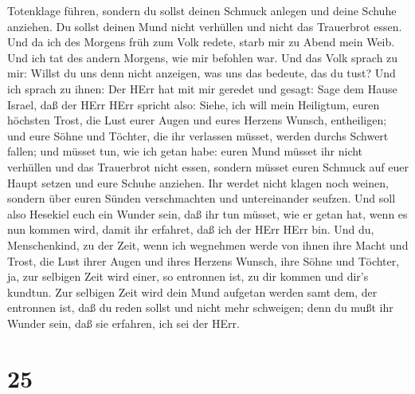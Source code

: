 Totenklage führen, sondern du sollst deinen Schmuck anlegen und deine
Schuhe anziehen. Du sollst deinen Mund nicht verhüllen und nicht das
Trauerbrot essen.  Und da ich des Morgens früh zum Volk
redete, starb mir zu Abend mein Weib. Und ich tat des andern Morgens,
wie mir befohlen war.  Und das Volk sprach zu mir: Willst
du uns denn nicht anzeigen, was uns das bedeute, das du tust?
 Und ich sprach zu ihnen: Der HErr hat mit mir geredet und
gesagt:  Sage dem Hause Israel, daß der HErr HErr spricht
also: Siehe, ich will mein Heiligtum, euren höchsten Trost, die Lust
eurer Augen und eures Herzens Wunsch, entheiligen; und eure Söhne und
Töchter, die ihr verlassen müsset, werden durchs Schwert fallen;
 und müsset tun, wie ich getan habe: euren Mund müsset ihr
nicht verhüllen und das Trauerbrot nicht essen,  sondern
müsset euren Schmuck auf euer Haupt setzen und eure Schuhe anziehen. Ihr
werdet nicht klagen noch weinen, sondern über euren Sünden verschmachten
und untereinander seufzen.  Und soll also Hesekiel euch ein
Wunder sein, daß ihr tun müsset, wie er getan hat, wenn es nun kommen
wird, damit ihr erfahret, daß ich der HErr HErr bin.  Und
du, Menschenkind, zu der Zeit, wenn ich wegnehmen werde von ihnen ihre
Macht und Trost, die Lust ihrer Augen und ihres Herzens Wunsch, ihre
Söhne und Töchter,  ja, zur selbigen Zeit wird einer, so
entronnen ist, zu dir kommen und dir's kundtun.  Zur
selbigen Zeit wird dein Mund aufgetan werden samt dem, der entronnen
ist, daß du reden sollst und nicht mehr schweigen; denn du mußt ihr
Wunder sein, daß sie erfahren, ich sei der HErr.

\hypertarget{section-24}{%
\section{25}\label{section-24}}

